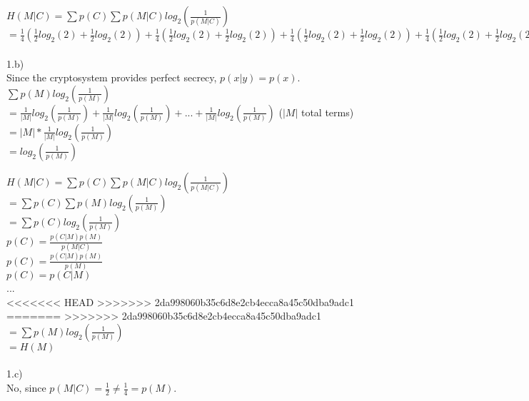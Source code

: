 \documentclass{assignment}
\begin{document}
\begin{problemlist}
\begin{problem}
\begin{answer}
$H(M|C)=\sum p(C)\sum p(M|C)log_2(\frac{1}{p(M|C)})$\\
$=\frac{1}{4}(\frac{1}{2}log_2(2) + \frac{1}{2}log_2(2)) + \frac{1}{4}(\frac{1}{2}log_2(2) + \frac{1}{2}log_2(2)) + \frac{1}{4}(\frac{1}{2}log_2(2) + \frac{1}{2}log_2(2)) + \frac{1}{4}(\frac{1}{2}log_2(2) + \frac{1}{2}log_2(2))$\\
\\
1.b)\\
Since the cryptosystem provides perfect secrecy, $p(x|y)=p(x)$.\\
$\sum p(M)log_2(\frac{1}{p(M)})$\\
$=\frac{1}{|M|}log_2(\frac{1}{p(M)})+\frac{1}{|M|}log_2(\frac{1}{p(M)})+...+\frac{1}{|M|}log_2(\frac{1}{p(M)})$  ($|M|$ total terms)\\
$=|M|*\frac{1}{|M|}log_2(\frac{1}{p(M)})$ \\
$=log_2(\frac{1}{p(M)})$ 

$H(M|C)=\sum p(C)\sum p(M|C)log_2(\frac{1}{p(M|C)})$\\
$=\sum p(C)\sum p(M)log_2(\frac{1}{p(M)})$\\
$=\sum p(C)log_2(\frac{1}{p(M)})$\\

$p(C)=\frac{p(C|M)p(M)}{p(M|C)}$\\
$p(C)=\frac{p(C|M)p(M)}{p(M)}$\\
$p(C)=p(C|M)$\\
...\\
<<<<<<< HEAD
>>>>>>> 2da998060b35c6d8e2cb4ecca8a45c50dba9adc1
=======
>>>>>>> 2da998060b35c6d8e2cb4ecca8a45c50dba9adc1
$=\sum p(M)log_2(\frac{1}{p(M)})$\\
$=H(M)$\\
\\
1.c)\\
No, since $p(M|C)=\frac{1}{2}\neq\frac{1}{4}=p(M)$.\\
\\
\end{answer}
\end{problem}


\end{problemlist}
\end{document}
